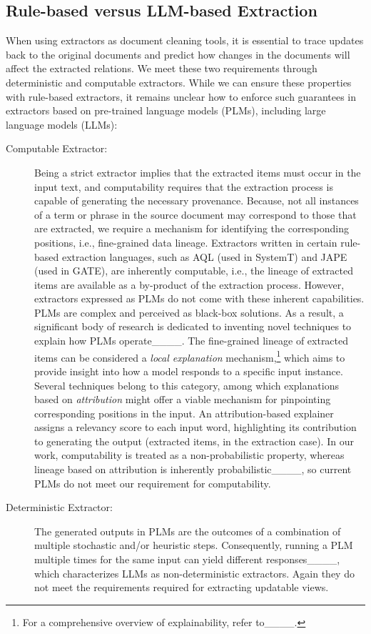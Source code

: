 \subsection{Rule-based  versus LLM-based Extraction}\label{subsubsec:whyrulebase}  


When using extractors as document cleaning tools, it is essential to trace updates back to the original documents and predict how changes in the documents will affect the extracted relations. We meet these two requirements through deterministic and computable extractors. While we can ensure these properties with rule-based extractors, it remains unclear how to enforce such guarantees in extractors based on pre-trained language models (PLMs), including large language models (LLMs):

\begin{description}
    
\item [Computable Extractor:] Being a strict extractor implies that the extracted items must occur in the input text, and computability requires that the extraction process is capable of generating the necessary provenance. Because, not all instances of a term or phrase in the source document may correspond to those that are extracted, we require a mechanism for identifying the corresponding positions, i.e., fine-grained data lineage. Extractors written in certain rule-based extraction languages, such as AQL (used in SystemT) and JAPE (used in GATE),  are inherently computable, i.e., the lineage of extracted items are available as a by-product of the extraction process. However, extractors expressed as PLMs do not come with these inherent capabilities. PLMs are  complex and   perceived as black-box solutions. As a result, a significant body of research is dedicated to inventing novel techniques to explain how PLMs operate____. The fine-grained lineage of extracted items can be considered a \textit{local explanation} mechanism,\footnote{For a comprehensive overview of explainability,  refer to____.} which aims to provide insight into how a model responds to a specific input instance. Several techniques belong to this category, among which explanations based on \textit{attribution} might offer a viable mechanism for pinpointing  corresponding positions in the input. An attribution-based explainer assigns a relevancy score to each input word, highlighting its contribution to generating the output (extracted items, in the extraction case). In our work,  computability is treated as a non-probabilistic property, whereas lineage based on attribution is inherently probabilistic____, so current PLMs do not meet our requirement for computability.

\item [Deterministic Extractor:] The generated outputs in PLMs are the outcomes of a combination of multiple stochastic and/or heuristic steps. Consequently, running a PLM multiple times for the same input can yield different responses____, which characterizes LLMs as non-deterministic extractors. Again they do not meet the requirements required for extracting updatable views.  

\end{description}
